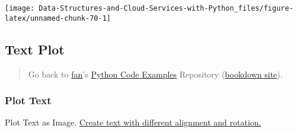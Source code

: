 \documentclass[
]{book}
\begin{document}
\begin{center}\texttt{[image: Data-Structures-and-Cloud-Services-with-Python\_files/figure-latex/unnamed-chunk-70-1]} \end{center}

\hypertarget{text-plot}{%
\subsection{Text Plot}\label{text-plot}}

\begin{quote}
Go back to \href{http://fanwangecon.github.io/}{fan}'s \href{https://fanwangecon.github.io/pyfan/}{Python Code Examples} Repository (\href{https://fanwangecon.github.io/pyfan/bookdown}{bookdown site}).
\end{quote}

\hypertarget{plot-text}{%
\subsubsection{Plot Text}\label{plot-text}}

Plot Text as Image. \href{https://matplotlib.org/3.1.1/gallery/pyplots/text_layout.html\#sphx-glr-gallery-pyplots-text-layout-py}{Create text with different alignment and rotation.}
\end{document}
